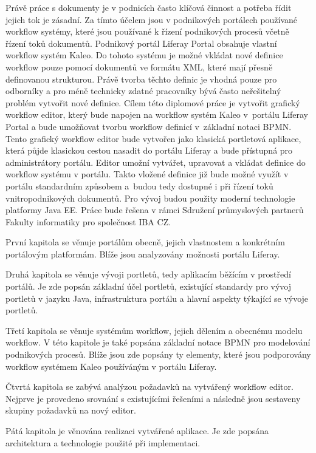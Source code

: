 \documentclass{fithesis}
\begin{document}
Právě práce s dokumenty je v podnicích často klíčová činnost a potřeba řídit jejich tok je zásadní. Za tímto účelem jsou v podnikových portálech používané workflow systémy, které jsou používané k řízení podnikových procesů včetně řízení toků dokumentů. Podnikový portál Liferay Portal obsahuje vlastní workflow systém Kaleo. Do tohoto systému je možné vkládat nové definice workflow pouze pomocí dokumentů ve formátu XML, které mají přesně definovanou strukturou. Právě tvorba těchto definic je vhodná pouze pro odborníky a pro méně technicky zdatné pracovníky bývá často neřešitelný problém vytvořit nové definice. Cílem této diplomové práce je vytvořit grafický workflow editor, který bude napojen na workflow systém Kaleo v~portálu Liferay Portal a bude umožňovat tvorbu workflow definicí v~základní notaci BPMN. Tento grafický workflow editor bude vytvořen jako klasická portletová aplikace, která půjde klasickou cestou nasadit do portálu Liferay a bude přístupná pro administrátory portálu. Editor umožní vytvářet, upravovat a vkládat definice do workflow systému v portálu. Takto vložené definice již bude možné využít v portálu standardním způsobem a~budou tedy dostupné i při řízení toků vnitropodnikových dokumentů. Pro vývoj budou použity moderní technologie platformy Java EE. Práce bude řešena v rámci Sdružení průmyslových partnerů Fakulty informatiky pro společnost IBA CZ.

První kapitola se věnuje portálům obecně, jejich vlastnostem a konkrétním portálovým platformám. Blíže jsou analyzovány možnosti portálu Liferay.

Druhá kapitola se věnuje vývoji portletů, tedy aplikacím běžícím v prostředí portálů. Je zde popsán základní účel portletů, existující standardy pro vývoj portletů v jazyku Java, infrastruktura portálu a hlavní aspekty týkající se vývoje portletů.

Třetí kapitola se věnuje systémům workflow, jejich dělením a obecnému modelu workflow. V této kapitole je také popsána základní notace BPMN pro modelování podnikových procesů. Blíže jsou zde popsány ty elementy, které jsou podporovány workflow systémem Kaleo používáným v portálu Liferay.

Čtvrtá kapitola se zabývá analýzou požadavků na vytvářený workflow editor. Nejprve je provedeno srovnání s existujícími řešeními a následně jsou sestaveny skupiny požadavků na nový editor.

Pátá kapitola je věnována realizaci vytvářené aplikace. Je zde popsána architektura a technologie použité při implementaci.
\end{document}
